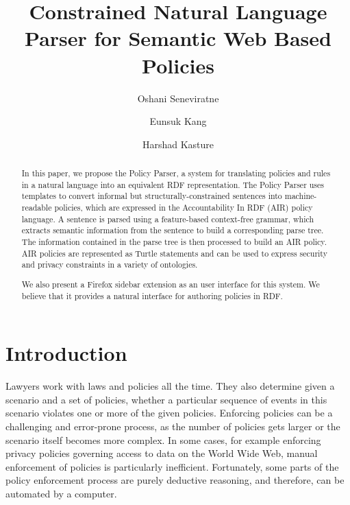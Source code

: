 \documentclass{llncs}
\begin{document}
\title{Constrained Natural Language Parser for Semantic Web Based Policies}

\author{Oshani Seneviratne \and Eunsuk Kang \and Harshad Kasture}


\maketitle
\begin{abstract}

In this paper, we propose the Policy Parser, a system for translating
policies and rules in a natural language into an equivalent RDF
representation. The Policy Parser uses
templates to convert informal but structurally-constrained sentences into 
machine-readable policies, which are expressed in the
Accountability In RDF (AIR) policy language. A sentence is parsed
using a feature-based context-free grammar, which extracts semantic
information from the sentence to build a corresponding parse tree. The
information contained in the parse tree is then processed to build
an AIR policy. AIR policies are represented as Turtle statements and
can be used to express security and privacy constraints in a variety
of ontologies.

We also present a Firefox sidebar extension as an user interface for this
system. We believe that it provides a natural interface for authoring
policies in RDF.

\end{abstract}


\section{Introduction}								
\label{sec:intro}

Lawyers work with laws and policies all the time. They also determine given a scenario and a set of policies, whether a particular sequence of events in this scenario violates one or more of the given policies. Enforcing policies can be a challenging and error-prone process, as the number of policies gets larger or the scenario itself becomes more complex. In some cases, for example enforcing privacy policies governing access to data on the World Wide Web, manual enforcement of policies is particularly inefficient. Fortunately, some parts of the policy enforcement process are purely deductive reasoning, and therefore, can be automated by a computer. 
\end{document}
